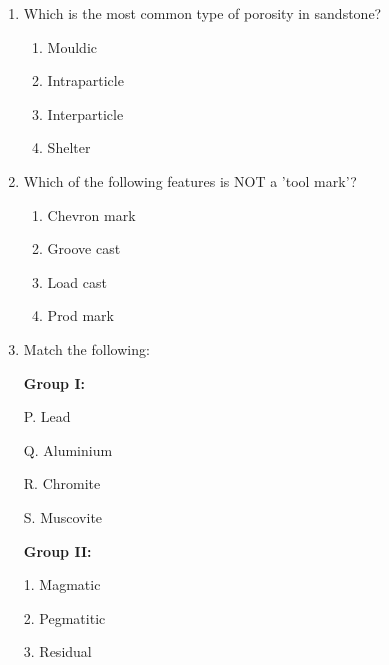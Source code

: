 \documentclass[journal,12pt,onecolumn]{IEEEtran}
\theoremstyle{remark}
\begin{document}
\begin{enumerate}[resume]
\begin{multicols}{2}
\begin{enumerate}
\item W
\item X
\item Y
\item Z
\end{enumerate}
\end{multicols}
\vspace{0.5cm}

\item Which is the most common type of porosity in sandstone?
\begin{multicols}{4}
\begin{enumerate}
\item Mouldic
\item Intraparticle
\item Interparticle
\item Shelter
\end{enumerate}
\end{multicols}
\vspace{0.5cm}

\item Which of the following features is NOT a 'tool mark'?
\begin{multicols}{4}
\begin{enumerate}
\item Chevron mark
\item Groove cast
\item Load cast
\item Prod mark
\end{enumerate}
\end{multicols}
\vspace{0.5cm}

\item Match the following:

\noindent
\begin{minipage}[t]{0.45\textwidth}
\textbf{Group I:}  

P. Lead  

Q. Aluminium  

R. Chromite  

S. Muscovite  
\end{minipage}
\hfill
\begin{minipage}[t]{0.45\textwidth}
\textbf{Group II:}  

1. Magmatic  

2. Pegmatitic  

3. Residual  


\end{minipage}
\end{enumerate}
\end{document}
